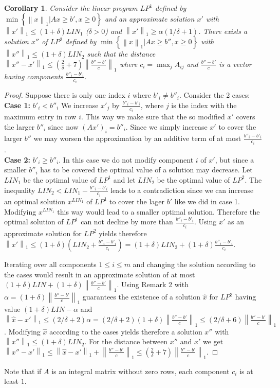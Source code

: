 \documentclass[a4paper,11pt]{article}
\newcommand{\menge}[1]{\left\{#1\right\}}
\newcommand{\nor}[1]{\left\|#1\right\|}
\newtheorem{cor}[thm]{Corollary}
\begin{document}
\begin{cor}
 Consider the linear program $LP^1$ defined by $\min \menge{\nor{x}_1 | Ax \geq b', x
  \geq 0 }$ and an approximate solution $x'$ with $\nor{x'}_1
  \leq (1 + \delta) \mathit{LIN}_1$ ($\delta > 0$) and $\nor{x'}_1 \geq \alpha (1/ \delta +1)$. There exists a solution
  $x''$ of $LP^2$ defined by $\min \menge{\nor{x}_1 | Ax \geq b'', x  \geq 0 }$ with $\nor{x''}_1
  \leq (1 + \delta) \mathit{LIN}_2$ such that the distance $\nor{x''-x'}_1 \leq (\frac{2}{\delta} +7)\nor{\frac{b''-b'}{c}}_1$
  where $c_i =\max_j A_{ij}$ and $\frac{b''-b'}{c}$ is a vector having components $\frac{b''_i-b'_i}{c_i}$.
\end{cor}
\begin{proof}
	Suppose there is only one index $i$ where $b'_i \neq b''_i$. Consider the 2 cases:\\
	{\bf Case 1:} $b'_i < b''_i$ We increase $x'_j$ by $\frac{b''_i -b'_i}{c_i}$, where $j$ is the index with the maximum entry in row $i$.
	This way we make sure that the so modified $x'$ covers the larger $b''_i$ since now $(Ax')_i = b''_i$.
	Since we simply increase $x'$ to cover the larger $b''$ we may worsen the approximation by an additive term of
	at most $\frac{b''_i -b'_i}{c_i}$.\\
	{\bf Case 2:} $b'_i \geq b''_i$. In this case we do not modify component $i$ of $x'$, but since a smaller $b''_i$ has to
	be covered the optimal value of a solution may decrease. 
	Let $\mathit{LIN}_1$ be the optimal value of $LP^1$ and let $\mathit{LIN}_2$ be the optimal value of $LP^2$.
	The inequality $\mathit{LIN}_2 < \mathit{LIN}_1 - \frac{b''_i-b'_i}{c_i}$ leads to a contradiction since
	we can increase an optimal solution $x^{\mathit{LIN}_1}$ of $LP^1$ to cover the lager $b'$ like 
	we did in case 1. Modifying 
	$x^{\mathit{LIN}_1}$ this way would lead to a smaller optimal solution.
	Therefore the optimal solution of $LP^1$ can not decline by more than $\frac{b''_i -b'_i}{c_i}$.
	Using $x'$ as an approximate solution for $LP^2$ yields therefore $\nor{x'}_1 \leq (1 + \delta) (\mathit{LIN}_2 
	+ \frac{b''_i -b'_i}{c_i})
	= (1 + \delta) \mathit{LIN}_2 + (1 + \delta)\frac{b''_i -b'_i}{c_i}$.
	
	Iterating over all components $1 \leq i \leq m$ and changing the solution according to the cases would result 
	in an approximate solution of at most
	$(1 + \delta) \mathit{LIN} + (1 + \delta) \nor{\frac{b''-b'}{c}}_1$.
	Using Remark 2 with $\alpha = (1 + \delta)\nor{\frac{b''-b'}{c}}_1$
	guarantees the existence of a solution $\hat{x}$ for $LP^2$ having value $(1 + \delta)\mathit{LIN} - \alpha$ and 
	$\nor{\hat{x}-x'}_1 \leq (2/ \delta +  2) \alpha = (2/ \delta +  2) (1 + \delta)\nor{\frac{b''-b'}{c}}_1
	\leq (2/ \delta +  6)\nor{\frac{b''-b'}{c}}_1$.
	Modifying $\hat{x}$ according to the cases yields therefore a solution $x''$ with $\nor{x''}_1 \leq 
	(1 + \delta) \mathit{LIN}_2$. For the distance between $x''$ and $x'$ we get $\nor{x''-x'}_1 \leq \nor{\hat{x}-x'}_1 + 
	\nor{\frac{b''-b'}{c}}_1 \leq (\frac{2}{\delta} +7)\nor{\frac{b''-b'}{c}}_1$.
\end{proof}
Note that if $A$ is an integral matrix without zero rows, each component $c_i$ is at least $1$.
\end{document}
